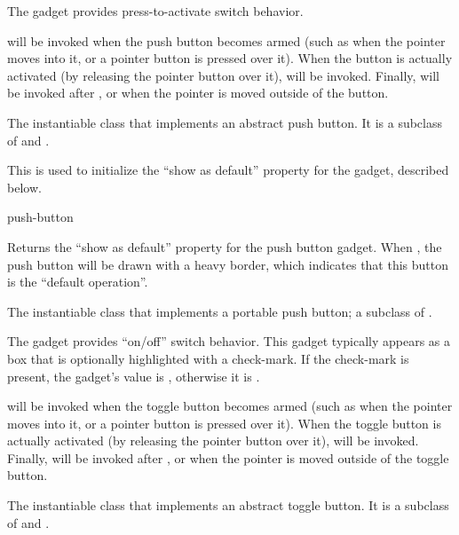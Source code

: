 
The  gadget provides press-to-activate switch behavior.

 will be invoked when the push button becomes armed (such as
when the pointer moves into it, or a pointer button is pressed over it).  When
the button is actually activated (by releasing the pointer button over it),
 will be invoked.  Finally,  will be
invoked after , or when the pointer is moved outside of
the button.


The instantiable class that implements an abstract push button.  It is a
subclass of  and .


This is used to initialize the ``show as default'' property for the gadget,
described below.

 {push-button}

Returns the ``show as default'' property for the push button gadget.  When
, the push button will be drawn with a heavy border, which indicates
that this button is the ``default operation''.


The instantiable class that implements a portable push button; a subclass of
.



The  gadget provides ``on/off'' switch behavior.  This gadget
typically appears as a box that is optionally highlighted with a check-mark.  If
the check-mark is present, the gadget's value is , otherwise it is
.

 will be invoked when the toggle button becomes armed (such as
when the pointer moves into it, or a pointer button is pressed over it).  When
the toggle button is actually activated (by releasing the pointer button over
it),  will be invoked.  Finally, 
will be invoked after , or when the pointer is moved
outside of the toggle button.


The instantiable class that implements an abstract toggle button.  It is a
subclass of  and .

